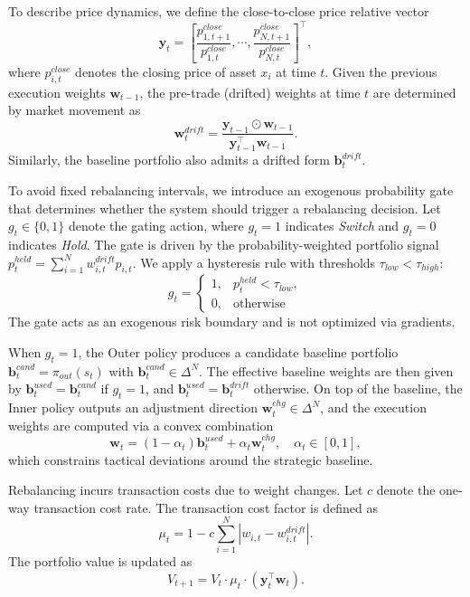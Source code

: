 \documentclass[letterpaper]{article} %
\begin{document}
To describe price dynamics, we define the close-to-close price relative vector
\begin{equation}
\mathbf{y}_t=\left[\frac{p^{close}_{1,t+1}}{p^{close}_{1,t}},\cdots,\frac{p^{close}_{N,t+1}}{p^{close}_{N,t}}\right]^\top,
\end{equation}
where $p^{close}_{i,t}$ denotes the closing price of asset $x_i$ at time $t$. Given the previous execution weights $\mathbf{w}_{t-1}$, the pre-trade (drifted) weights at time $t$ are determined by market movement as
\begin{equation}
\mathbf{w}^{drift}_t=\frac{\mathbf{y}_{t-1}\odot \mathbf{w}_{t-1}}{\mathbf{y}_{t-1}^\top \mathbf{w}_{t-1}}.
\end{equation}
Similarly, the baseline portfolio also admits a drifted form $\mathbf{b}^{drift}_t$.

To avoid fixed rebalancing intervals, we introduce an exogenous probability gate that determines whether the system should trigger a rebalancing decision. Let $g_t\in\{0,1\}$ denote the gating action, where $g_t=1$ indicates \emph{Switch} and $g_t=0$ indicates \emph{Hold}. The gate is driven by the probability-weighted portfolio signal $p_t^{held}=\sum_{i=1}^N w^{drift}_{i,t}p_{i,t}$. We apply a hysteresis rule with thresholds $\tau_{low}<\tau_{high}$:
\begin{equation}
g_t=
\begin{cases}
1,& p_t^{held}<\tau_{low},\\
0,& \text{otherwise}
\end{cases}
\end{equation}
The gate acts as an exogenous risk boundary and is not optimized via gradients.

When $g_t=1$, the Outer policy produces a candidate baseline portfolio $\mathbf{b}^{cand}_t=\pi_{out}(s_t)$ with $\mathbf{b}^{cand}_t\in\Delta^N$. The effective baseline weights are then given by $\mathbf{b}^{used}_t=\mathbf{b}^{cand}_t$ if $g_t=1$, and $\mathbf{b}^{used}_t=\mathbf{b}^{drift}_t$ otherwise. On top of the baseline, the Inner policy outputs an adjustment direction $\mathbf{w}^{chg}_t\in\Delta^N$, and the execution weights are computed via a convex combination
\begin{equation}
\mathbf{w}_t=(1-\alpha_t)\mathbf{b}^{used}_t+\alpha_t \mathbf{w}^{chg}_t,
\quad \alpha_t\in[0,1],
\end{equation}
which constrains tactical deviations around the strategic baseline.

Rebalancing incurs transaction costs due to weight changes. Let $c$ denote the one-way transaction cost rate. The transaction cost factor is defined as
\begin{equation}
\mu_t = 1-c\sum_{i=1}^N \left|w_{i,t}-w^{drift}_{i,t}\right|.
\end{equation}
The portfolio value is updated as
\begin{equation}
V_{t+1}=V_t\cdot \mu_t \cdot (\mathbf{y}_t^\top \mathbf{w}_t).
\end{equation}
\end{document}
